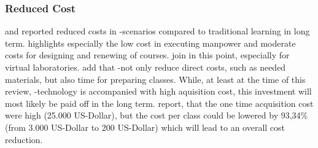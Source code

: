 \subsubsection{Reduced Cost}
\cite{Leblanc.2010} and \cite{MartinGutierrez.2011} reported reduced costs in \ARns-scenarios compared to traditional learning in long term. \cite{Chen.2012} highlights especially the low cost in executing manpower and moderate costs for designing and renewing of courses.\autocite[cf.][640]{Chen.2012} \cite{Andujar.2011} join in this point, especially for virtual laboratories.\autocite[cf.][492]{Andujar.2011} \cite{Andujar.2011} add that \ARns-\apps not only reduce direct costs, such as needed materials, but also time for preparing classes. While, at least at the time of this review, \ARns-technology is accompanied with high aquisition cost, this investment will most likely be paid off in the long term. \cite{Leblanc.2010} report, that the one time acquisition cost were high (25.000 US-Dollar)\autocite[253]{Leblanc.2010}, but the cost per class could be lowered by 93,34\% (from 3.000 US-Dollar to 200 US-Dollar)\autocite[253]{Leblanc.2010} which will lead to an overall cost reduction.